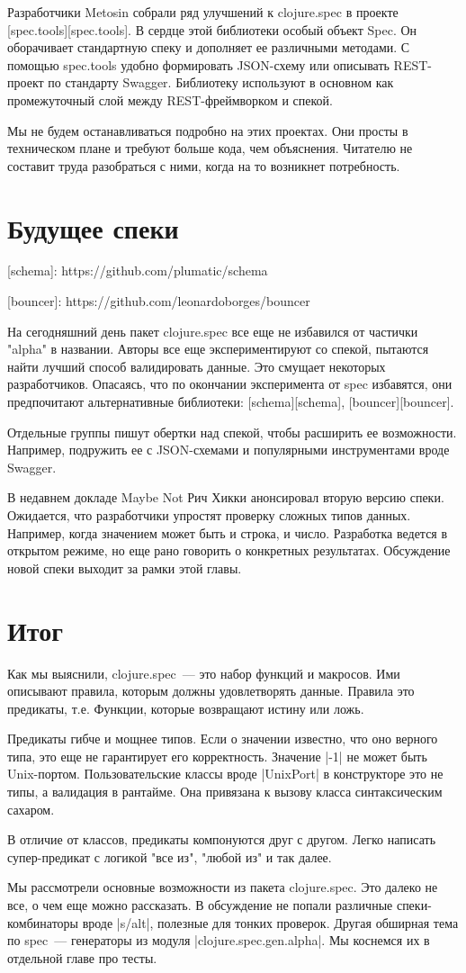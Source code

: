 Разработчики Metosin собрали ряд улучшений к clojure.spec в проекте
[spec.tools][spec.tools]. В сердце этой библиотеки особый объект Spec. Он
оборачивает стандартную спеку и дополняет ее различными методами. С помощью
spec.tools удобно формировать JSON-схему или описывать REST-проект по стандарту
Swagger. Библиотеку используют в основном как промежуточный слой между
REST-фреймворком и спекой.

Мы не будем останавливаться подробно на этих проектах. Они просты в техническом
плане и требуют больше кода, чем объяснения. Читателю не составит труда
разобраться с ними, когда на то возникнет потребность.

\section{Будущее спеки}

[schema]: https://github.com/plumatic/schema

[bouncer]: https://github.com/leonardoborges/bouncer

На сегодняшний день пакет clojure.spec все еще не избавился от частички "alpha"
в названии. Авторы все еще экспериментируют со спекой, пытаются найти лучший
способ валидировать данные. Это смущает некоторых разработчиков. Опасаясь, что
по окончании эксперимента от spec избавятся, они предпочитают альтернативные
библиотеки: [schema][schema], [bouncer][bouncer].

Отдельные группы пишут обертки над спекой, чтобы расширить ее
возможности. Например, подружить ее с JSON-схемами и популярными инструментами
вроде Swagger.

В недавнем докладе Maybe Not Рич Хикки анонсировал вторую версию
спеки. Ожидается, что разработчики упростят проверку сложных типов
данных. Например, когда значением может быть и строка, и число. Разработка
ведется в открытом режиме, но еще рано говорить о конкретных
результатах. Обсуждение новой спеки выходит за рамки этой главы.

\section{Итог}

Как мы выяснили, clojure.spec~--- это набор функций и макросов. Ими описывают
правила, которым должны удовлетворять данные. Правила это предикаты,
т.е. Функции, которые возвращают истину или ложь.

Предикаты гибче и мощнее типов. Если о значении известно, что оно верного типа,
это еще не гарантирует его корректность. Значение \spverb|-1| не может быть
Unix-портом. Пользовательские классы вроде \spverb|UnixPort| в конструкторе это не
типы, а валидация в рантайме. Она привязана к вызову класса синтаксическим
сахаром.

В отличие от классов, предикаты компонуются друг с другом. Легко написать
супер-предикат с логикой "все из", "любой из" и так далее.

Мы рассмотрели основные возможности из пакета clojure.spec. Это далеко не все, о
чем еще можно рассказать. В обсуждение не попали различные спеки-комбинаторы
вроде \spverb|s/alt|, полезные для тонких проверок. Другая обширная тема по spec~---
генераторы из модуля \spverb|clojure.spec.gen.alpha|. Мы коснемся их в отдельной главе
про тесты.

